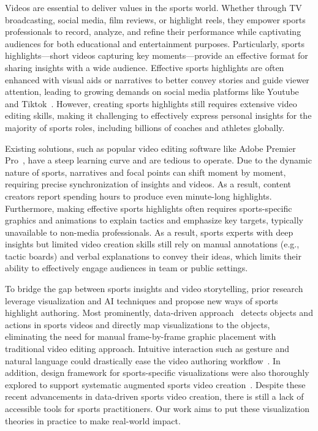 
Videos are essential to deliver values in the sports world. Whether through TV broadcasting, social media, film reviews, or highlight reels, they empower sports professionals to record, analyze, and refine their performance while captivating audiences for both educational and entertainment purposes.
Particularly, sports highlights—short videos capturing key moments—provide an effective format for sharing insights with a wide audience. Effective sports highlights are often enhanced with visual aids or narratives to better convey stories and guide viewer attention,
leading to growing demands on social media platforms like Youtube and Tiktok~\cite{genz}. 
However, creating sports highlights still requires extensive video editing skills, making it challenging to effectively express personal insights for the majority of sports roles, including billions of coaches and athletes globally. 

Existing solutions, such as popular video editing software like Adobe Premier Pro~\cite{premiere}, have a steep learning curve and are tedious to operate. Due to the dynamic nature of sports, narratives and focal points can shift moment by moment, requiring precise synchronization of insights and videos. As a result, content creators report spending hours to produce even minute-long highlights. 
% 
Furthermore, making effective sports highlights often requires sports-specific graphics and animations to explain tactics and emphasize key targets, typically unavailable to non-media professionals. As a result, sports experts with deep insights but limited video creation skills still rely on manual annotations (e.g., tactic boards) and verbal explanations to convey their ideas, which limits their ability to effectively engage audiences in team or public settings.

% 
To bridge the gap between sports insights and video storytelling,
prior research leverage visualization and AI techniques and propose new ways of sports highlight authoring. Most prominently, data-driven approach~\cite{chen2021augmenting} detects objects and actions in sports videos and directly map visualizations to the objects, eliminating the need for manual frame-by-frame graphic placement with traditional video editing approach. 
Intuitive interaction such as gesture and natural language could drastically ease the video authoring workflow~\cite{chen2022sporthesia,chen2023iball}. 
In addition, design framework for sports-specific visualizations were also thoroughly explored to support systematic augmented sports video creation~\cite{lin2022quest, yao2023designing}. 
% 
Despite these recent advancements in data-driven sports video creation, there is still a lack of accessible tools for sports practitioners. Our work aims to put these visualization theories in practice to make real-world impact.


